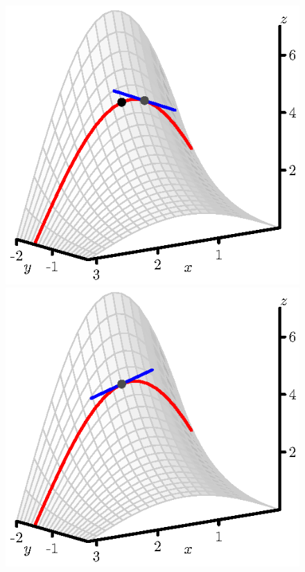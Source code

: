 \begin{figure}[ht]
  \begin{center}
    \includegraphics[scale=0.8]{figures/fig_10_3_fxx_1.eps}
    \includegraphics[scale=0.8]{figures/fig_10_3_fxx_2.eps}

\end{center}
\end{figure}
